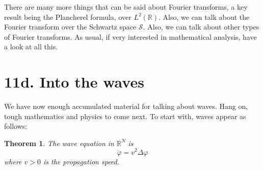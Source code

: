 \documentclass[12pt]{amsbook}
\newtheorem{theorem}{Theorem}[chapter]
\begin{document}
There are many more things that can be said about Fourier transforms, a key result being the Plancherel formula, over $L^2(\mathbb R)$. Also, we can talk about the Fourier transform over the Schwartz space $\mathcal S$. Also, we can talk about other types of Fourier transforms. As usual, if very interested in mathematical analysis, have a look at all this.

\section*{11d. Into the waves}


We have now enough accumulated material for talking about waves. Hang on, tough mathematics and physics to come next. To start with, waves appear as follows:


\begin{theorem}
The wave equation in $\mathbb R^N$ is
$$\ddot{\varphi}=v^2\Delta\varphi$$
where $v>0$ is the propagation speed.
\end{theorem}
\end{document}
